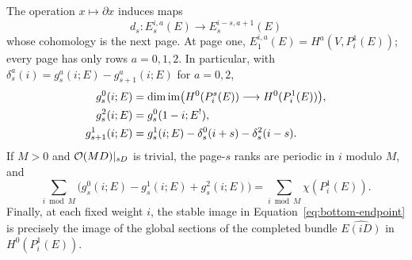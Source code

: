 \begin{lemma}\label{lem:page-calculus}
The operation $x\mapsto\partial x$ induces maps
\[
 d_s:E_s^{i,a}(E)\longrightarrow E_s^{i-s,a+1}(E)
\]
whose cohomology is the next page. At page one,
$E_1^{i,a}(E)=H^a(V,P_i^1(E))$; every page has only rows
$a=0,1,2$. In particular, with
$\delta_s^a(i)=g_s^a(i;E)-g_{s+1}^a(i;E)$ for $a=0,2$,
\begin{align}
 g_s^0(i;E)
 &=\dim\operatorname{im}\bigl(H^0(P_i^s(E))\longrightarrow H^0(P_i^1(E))\bigr),
 \label{eq:bottom-endpoint}\\
 g_s^2(i;E)&=g_s^0(1-i;E^!),\label{eq:top-endpoint}\\
 g_{s+1}^1(i;E)
 &=g_s^1(i;E)-\delta_s^0(i+s)-\delta_s^2(i-s).
 \label{eq:middle-recurrence}
\end{align}
If $M>0$ and $\mathcal O(MD)|_{sD}$ is trivial, the page-$s$ ranks are
periodic in $i$ modulo $M$, and
\begin{equation}\label{eq:periodic-euler}
 \sum_{i\bmod M}\bigl(g_s^0(i;E)-g_s^1(i;E)+g_s^2(i;E)\bigr)
 =\sum_{i\bmod M}\chi(P_i^1(E)).
\end{equation}
Finally, at each fixed weight $i$, the stable image in
Equation~\ref{eq:bottom-endpoint} is precisely the image of the
global sections of the completed bundle $\widehat{E(iD)}$ in
$H^0(P_i^1(E))$.
\end{lemma}

